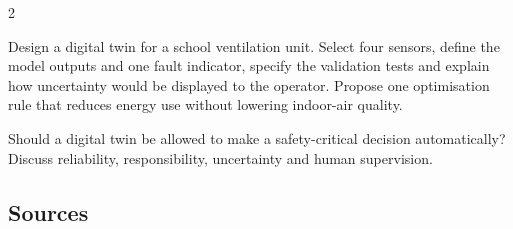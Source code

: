 \begin{multicols}{2}
\begin{engineeringchallenge}
Design a digital twin for a school ventilation unit. Select four sensors, define the model outputs and
one fault indicator, specify the validation tests and explain how uncertainty would be displayed to the
operator. Propose one optimisation rule that reduces energy use without lowering indoor-air quality.
\end{engineeringchallenge}

\begin{speaking}
Should a digital twin be allowed to make a safety-critical decision automatically? Discuss reliability,
responsibility, uncertainty and human supervision.
\end{speaking}
\end{multicols}

\subsection*{Sources}
